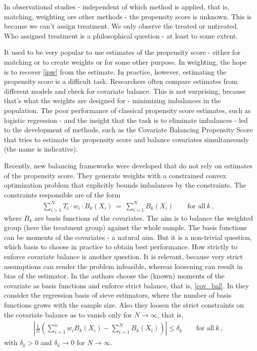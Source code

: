 In observational studies - independent of which method is applied, that is, matching, weighting ore other methods -
the propensity score is unknown.
This is because we can't assign treatment. We only observe the treated or untreated. Who assigned treatment is a philosophical question - at least to some extent.

It used to be very popular to use estimates of the propensity score - either for matching or to create weights or for some other purpose.
In weighting, the hope is to recover \eqref{ipw} from the estimate.
In practice, however, estimating the propensity score is a difficult task.
Researchers often compare estimates from different models and check for covariate balance. 
This is not surprising, because that's what the weights are designed for - minimizing imbalances in the population.
The poor performance of classical propensity score estimates, such as logistic regression - and the insight that the task is to eliminate imbalances -
led to the development of methods, such as the Covariate Balancing Propensity Score \cite{Imai2014a} that tries to 
estimate the propensity score and balance covariates simultaneously (the name is indicative).

Recently, new balancing frameworks were developed that do not rely on estimates of the propensity score\cite{Hainmueller2012,Zubizarreta2015}.
They generate weights with a constrained convex optimization problem that explicitly bounds imbalances by the constraints. 
The constraints responsible are of the form
\begin{gather}
  \label{cov_bal}
    \sum_{i=1}^{N}
    T_i
    \cdot
    w_i
    \cdot
    B_k(X_i)
    \ 
  =
    \ 
    \sum_{i=1}^{N} 
    B_k(X_i)
  \qquad
  \text{for all}\ 
  k\,,
\end{gather}
where $B_k$ are basis functions of the covariates.
The aim is to balance the weighted group (here the treatment group) against the whole sample.
The basis functions can be moments of the covariates - a natural aim. 
But it is a non-trivial question, which basis to choose in practice to obtain best performance.
How strictly to enforce covariate balance is another question.
It is relevant, because very strict assumptions can render the problem infeasible, whereas loosening can result in bias of the estimator.
In \cite{Hainmueller2012} the authors choose the (known) moments of the covariate as basis functions and enforce strict balance, that is, \eqref{cov_bal}.
In \cite{Wang2019} they consider the regression basis of sieve estimators\cite{Newey1997a}, where the number of basis functions grows with the sample size.
Also they loosen the strict constraints on the covariate balance as to vanish only for $N\to\infty$, that is,
\begin{gather*}
  \left| 
  \frac{1}{N}
  \left( 
    \sum_{i=1}^{n}
    w_i
    B_k(X_i)
    -
    \sum_{i=1}^{N} 
    B_k(X_i)
  \right)
  \right|
  \le
  \delta_k
  \qquad
  \text{for all}\ 
  k\,,
\end{gather*}
with $\delta_k > 0 $ and $\delta_k\to 0$ for $N\to\infty$.

